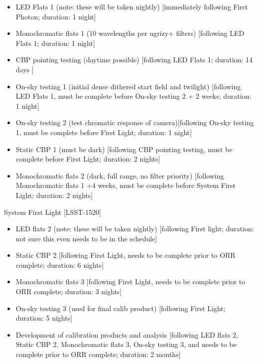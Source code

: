 \documentclass[SE,authoryear,toc,lsstdraft]{lsstdoc}
\begin{document}
\begin{itemize}

  \item LED Flats 1 (note: these will be taken nightly) [immediately following First Photon; duration: 1 night]

  \item Monochromatic flats 1 (10 wavelengths per ugrizy+ filters) [following LED Flats 1; duration: 1 night]

  \item CBP pointing testing (daytime possible) [following LED Flats 1; duration: 14 days ]

  \item On-sky testing 1 (initial dense dithered start field and twilight) [following LED Flats 1, must be complete before On-sky testing 2 + 2 weeks; duration: 1 night]

  \item On-sky testing 2 (test chromatic response of camera)[following On-sky testing 1, must be complete before First Light; duration: 1 night]

  \item Static CBP 1 (must be dark) [following CBP pointing testing, must be complete before First Light; duration: 2 nights]

  \item Monochromatic flats 2 (dark, full range, no filter priority) [following Monochromatic flats 1 +4 weeks, must be complete before System First Light; duration: 2 nights]

\end{itemize}

System First Light [LSST-1520]

\begin{itemize}

  \item LED flats 2 (note: these will be taken nightly) [following First light; duration: not sure this even needs to be in the
schedule]

  \item Static CBP 2 [following First Light, needs to be complete prior to ORR complete; duration: 6 nights]

  \item Monochromatic flats 3 [following First Light, needs to be complete prior to ORR complete; duration: 3 nights]

  \item On-sky testing 3 (used for final calib product) [following First Light; duration: 5 nights]

  \item Development of calibration products and analysis [following LED flats 2, Static CBP 2, Monochromatic
flats 3, On-sky testing 3, and needs to be complete prior to ORR complete; duration: 2 months]

\end{itemize}
\end{document}
